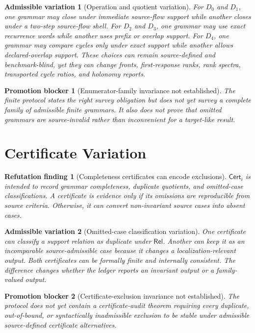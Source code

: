 \documentclass[11pt]{article}
\newcommand{\Cert}{\mathsf{Cert}}
\newcommand{\Rel}{\mathsf{Rel}}
\newtheorem{finding}{Refutation finding}
\newtheorem{variation}{Admissible variation}
\newtheorem{blocker}{Promotion blocker}
\begin{document}
\begin{variation}[Operation and quotient variation]
For \(D_0\) and \(D_1\), one grammar may close under immediate source-flow
support while another closes under a two-step source-flow shell. For \(D_2\)
and \(D_3\), one grammar may use exact recurrence words while another uses
prefix or overlap support. For \(D_4\), one grammar may compare cycles only
under exact support while another allows declared-overlap support. These
choices can remain source-defined and benchmark-blind, yet they can change
fronts, first-response ranks, rank spectra, transported cycle ratios, and
holonomy reports.
\end{variation}

\begin{blocker}[Enumerator-family invariance not established]
The finite protocol states the right survey obligation but does not yet
survey a complete family of admissible finite grammars. It also does not
prove that omitted grammars are source-invalid rather than inconvenient for a
target-like result.
\end{blocker}

\section{Certificate Variation}

\begin{finding}[Completeness certificates can encode exclusions]
\(\Cert_i\) is intended to record grammar completeness, duplicate quotients,
and omitted-case classifications. A certificate is evidence only if its
omissions are reproducible from source criteria. Otherwise, it can convert
non-invariant source cases into absent cases.
\end{finding}

\begin{variation}[Omitted-case classification variation]
One certificate can classify a support relation as duplicate under
\(\Rel\). Another can keep it as an incomparable source-admissible case
because it changes a localization-relevant output. Both certificates can be
formally finite and internally consistent. The difference changes whether the
ledger reports an invariant output or a family-valued output.
\end{variation}

\begin{blocker}[Certificate-exclusion invariance not established]
The protocol does not yet contain a certificate-audit theorem requiring every
duplicate, out-of-bound, or syntactically inadmissible exclusion to be stable
under admissible source-defined certificate alternatives.
\end{blocker}
\end{document}
